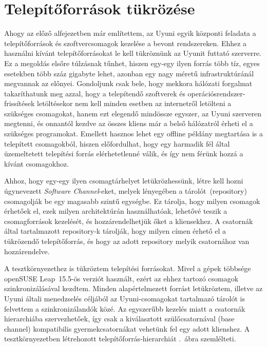 \section{Telepítőforrások tükrözése}
\label{sect:reposync}
Ahogy az előző alfejezetben már említettem, az Uyuni egyik központi feladata a telepítőforrások és szoftvercsomagok kezelése a bevont rendszereken. Ehhez a használni kívánt telepítőforrásokat le kell tükröznünk az Uyunit futtató szerverre. Ez a megoldás elsőre túlzásnak tűnhet, hiszen egy-egy ilyen forrás több tíz, egyes esetekben több száz gigabyte lehet, azonban egy nagy méretű infrastruktúránál megvannak az előnyei. Gondoljunk csak bele, hogy mekkora hálózati forgalmat takaríthatunk meg azzal, hogy a telepítendő szoftverek és operációsrendszer-frissítések letöltésekor nem kell minden esetben az internetről letölteni a szükséges csomagokat, hanem ezt elegendő mindössze egyszer, az Uyuni szerveren megtenni, és onnantól kezdve az összes kliens már a belső hálózatról érheti el a szükséges programokat.
Emellett hasznos lehet egy offline példány megtartása is a telepített csomagokból, hiszen előfordulhat, hogy egy harmadik fél által üzemeltetett telepítési forrás elérhetetlenné válik, és így nem férünk hozzá a kívánt csomagokhoz.

Ahhoz, hogy egy-egy ilyen csomagtárhelyet letükrözhessünk, létre kell hozni úgynevezett \textit{Software Channel}-eket, melyek lényegében a tárolót~(repository) csomagolják be egy magasabb szintű egységbe. Ez tárolja, hogy milyen csomagok érhetőek el, ezek milyen architektúrán használhatóak, lehetővé teszik a csomagforrások kezelését, és hozzárendelhetjük őket a kliensekhez. A csatornák által tartalmazott repository-k tárolják, hogy milyen címen érhető el a tükrözendő telepítőforrás, és hogy az adott repository melyik csatornához van hozzárendelve.

A tesztkörnyezethez is tükröztem telepítési forrásokat. Mivel a gépek többsége openSUSE Leap~15.5-ös verziót használt, ezért az ehhez tartozó csomagok szinkronizálásával kezdtem. Minden alapértelmezett forrást letükröztem, illetve az Uyuni általi menedzselés céljából az Uyuni-csomagokat tartalmazó tárolót is felvettem a szinkronizálandók közé. Az egyszerűbb kezelés miatt a csatornák hierarchiába szervezhetőek, így csak a kiválasztott szülőcsatornával (base channel) kompatibilis gyermekcsatornákat vehetünk fel egy adott klienshez. A tesztkörnyezetben létrehozott telepítőforrás-hierarchiát .~ábra szemlélteti.

